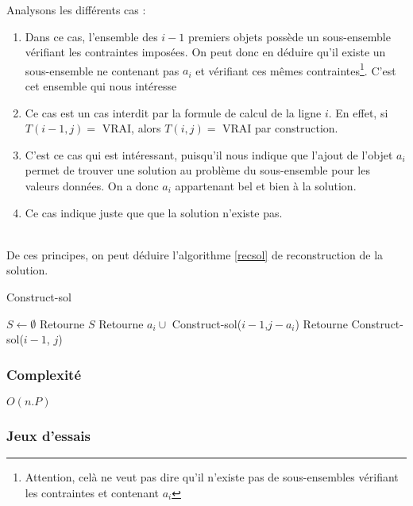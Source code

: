 Analysons les différents cas : \begin{enumerate}
	\item Dans ce cas, l'ensemble des $i-1$ premiers objets possède un sous-ensemble vérifiant les
		contraintes imposées. On peut donc en déduire qu'il existe un sous-ensemble ne contenant pas
		$a_i$ et vérifiant ces mêmes contraintes\footnote{Attention, celà ne veut pas dire qu'il
		n'existe pas de sous-ensembles vérifiant les contraintes et contenant $a_i$}. C'est cet ensemble
		qui nous intéresse
	\item Ce cas est un cas interdit par la formule de calcul de la ligne $i$. En effet, si $T(i-1, j)
		=$ VRAI, alors $T(i,j) =$ VRAI par construction.
	\item C'est ce cas qui est intéressant, puisqu'il nous indique que l'ajout de l'objet $a_i$ permet
		de trouver une solution au problème du sous-ensemble pour les valeurs données. On a donc $a_i$
		appartenant bel et bien à la solution.
	\item Ce cas indique juste que que la solution n'existe pas.
\end{enumerate}
~\\
De ces principes, on peut déduire l'algorithme \ref{recsol} de reconstruction de la solution.
\begin{algorithm}
	\caption{Construct-sol}
	\label{recsol}
	\begin{algorithmic}[1]
		\STATE $S \leftarrow \emptyset$
			\STATE Retourne $S$
		\ELSE
				\STATE Retourne $a_i \cup$ Construct-sol($i-1$,$j-a_i$)
			\ELSE
				\STATE Retourne Construct-sol($i-1$, $j$)
			\ENDIF
		\ENDIF
	\end{algorithmic}
\end{algorithm}


\subsubsection{Complexité}
$O(n.P)$

\subsubsection{Jeux d'essais}


